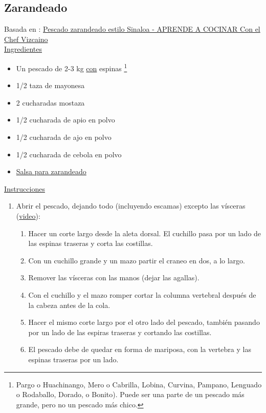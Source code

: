 \subsection{Zarandeado}

Basada en : \href{https://aprendeacocinarfacil.wordpress.com/2012/03/13/pescado-sarandeado-estilo-sinaloa-aya-pinchi/}{Pescado zarandeado estilo Sinaloa - APRENDE A COCINAR Con el Chef Vizcaino} \\

\underline{Ingredientes}
\begin{itemize}
\item Un pescado de 2-3 kg \underline{con} espinas \footnote{Pargo o Huachinango, Mero o Cabrilla, Lobina, Curvina, Pampano, Lenguado o Rodaballo, Dorado, o Bonito). Puede ser una parte de un pescado más grande, pero no un pescado más chico.}
\item 1/2 taza de mayonesa
\item 2 cucharadas mostaza
\item 1/2 cucharada de apio en polvo
\item 1/2 cucharada de ajo en polvo
\item 1/2 cucharada de cebola en polvo
\item \hyperref[salsa-zarandeado]{Salsa para zarandeado}
\end{itemize}


\underline{Instrucciones}
\begin{enumerate}
\item Abrir el pescado, dejando todo (incluyendo escamas) excepto las vísceras (\href{https://www.youtube.com/watch?v=_OmdFQWyWRc}{video}):
\begin{enumerate}
\item Hacer un corte largo desde la aleta dorsal. El cuchillo pasa por un lado de las espinas traseras y corta las costillas.
\item Con un cuchillo grande y un mazo partir el craneo en dos, a lo largo.
\item Remover las vísceras con las manos (dejar las agallas).
\item Con el cuchillo y el mazo romper cortar la columna vertebral después de la cabeza antes de la cola.
\item Hacer el mismo corte largo por el otro lado del pescado, también pasando por un lado de las espiras traseras y cortando las costillas.
\item El pescado debe de quedar en forma de mariposa, con la vertebra y las espinas traseras por un lado.
\end{enumerate}

\end{enumerate}
